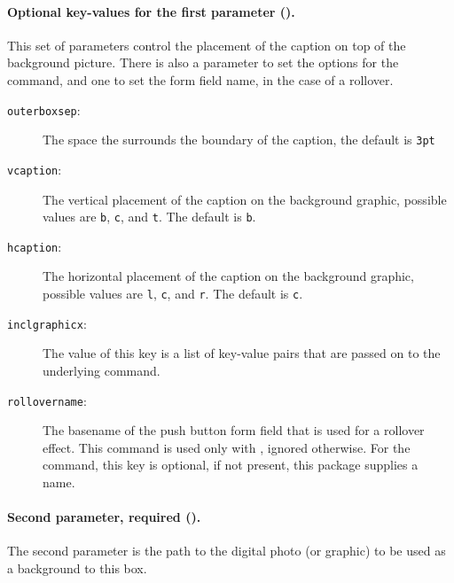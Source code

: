 \documentclass{article}
\begin{document}
\paragraph*{Optional key-values for the first parameter ().} This set of parameters
 control the placement of the caption on top of the background picture. There is
 also a parameter to set the options for the  command, and one to set
the  form field name, in the case of a rollover.
\begin{description}
\item[\texttt{outerboxsep}:] The space the surrounds the boundary of the caption, the default is \texttt{3pt}
\item[\texttt{vcaption}:] The vertical placement of the caption on the background graphic, possible
   values are \texttt{b}, \texttt{c}, and \texttt{t}. The default is \texttt{b}.
\item[\texttt{hcaption}:] The horizontal placement of the caption on the background graphic, possible
   values are \texttt{l}, \texttt{c}, and \texttt{r}. The default is \texttt{c}.
\item[\texttt{inclgraphicx}:] The value of this key is a list of key-value pairs that are passed on to the
  underlying  command.
\item[\texttt{rollovername}:] The basename of the push button form field that is used for a rollover effect.
   This command is used only with , ignored otherwise. For the 
   command, this key is optional, if not present, this package supplies a name.
\end{description}

\paragraph*{Second parameter, required ().} The second parameter is
 the path to the digital photo (or graphic) to be used as a background to
 this box.
\end{document}

